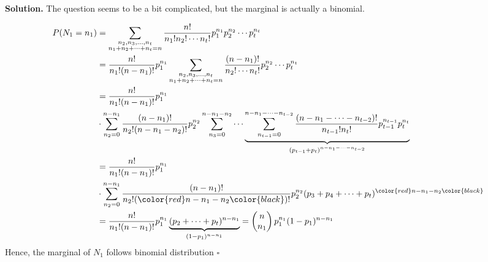 \documentclass[12pt]{article}
\begin{document}
\begin{enumerate}
\textbf{Solution.} The question seems to be a bit complicated, but the marginal is actually a binomial. 


\begin{equation*}
   \begin{aligned}
    P(N_1 = n_1) &= \sum_{\substack{n_2,n_3,\dots, n_t\\ n_1 + n_2 + \cdots + n_t = n}} \frac{n!}{n_1!n_2!\cdots n_t!}p_1^{n_1} p_2^{n_2}\cdots p_t^{n_t} 
            \\ &= \frac{n!}{n_1!(n-n_1)!}p_1^{n_1}\sum_{\substack{n_2,n_3,\dots, n_t\\ n_1 + n_2 + \cdots + n_t = n}} \frac{(n-n_1)!}{n_2!\cdots n_t!}p_2^{n_2}\cdots p_t^{n_t}
            \\ &= \frac{n!}{n_1!(n-n_1)!}p_1^{n_1}
            \\ & \cdot \sum_{n_2 = 0 }^{n-n_1} \frac{(n-n_1)!}{n_2!(n-n_{1}-n_2)!}p_2^{n_2}\sum_{n_3=0}^{n-n_{1}-n_2 } \cdots \underbrace{\sum_{n_{t-1}=0}^{n- n_1 -\cdots-n_{t-2}} \frac{(n-n_{1}-\cdots-n_{t-2}  )!}{n_{t-1}!n_t!} p_{t-1}^{n_{t-1}}p_t^{n_t}}_{(p_{t-1}+p_t)^{n-n_1-\cdots-n_{t-2} }}
            \\ &= \frac{n!}{n_1!(n-n_1)!}p_1^{n_1}
            \\ & \cdot \sum_{n_2 = 0 }^{n-n_1} \frac{(n-n_1)!}{n_2!(\color{red}n-n_{1}-n_2\color{black})!}p_2^{n_2} (p_3 + p_4 + \cdots + p_t )^{\color{red}n-n_{1}-n_2\color{black}} 
            \\ &= \frac{n!}{n_1!(n-n_1)!}p_1^{n_1}\underbrace{(p_2 +\cdots+p_t)^{n-n_1}}_{(1-p_1)^{n-n_1}} = \begin{pmatrix}
                 n \\
                 n_1 \\
            \end{pmatrix} p_1^{n_1}(1-p_1)^{n-n_1}
    \end{aligned} 
\end{equation*}
Hence, the marginal of \(N_1\) follows binomial distribution \(\square\)  

\end{enumerate}
\end{document}
